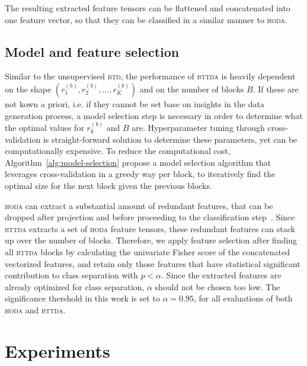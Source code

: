 \documentclass[twocolumn]{article}
\begin{document}
The resulting extracted feature tensors can be flattened and concatenated into
one feature vector, so that they can be classified in a similar manner to
\textsc{hoda}.


\subsection{Model and feature selection}
Similar to the unsupervised \textsc{btd}, the performance of \textsc{bttda} is
heavily dependent on the shape $\left(r_1^{(b)}, r_2^{(b)}, \ldots,
r_K^{(b)}\right)$ and on the number of blocks $B$.
If these are not kown a priori, i.e. if they cannot be set base on insights in the
data generation process, a model selection step is necessary in order to
determine what the optimal values for $r_k^{(b)}$ and $B$ are.
Hyperparameter tuning through cross-validation is straight-forward solution to
determine these parameters, yet can be computationally expensive.
To reduce the computational cost, Algorithm~\ref{alg:model-selection} propose a model selection algorithm that
leverages cross-validation in a greedy way per block, to iteratively find the
optimal size for the next block given the previous blocks.

\textsc{hoda} can extract a substantial amount of redundant features, that can
be dropped after projection and before proceeding to the classification
step~\cite{Phan2010}.
Since \textsc{bttda} extracts a set of \textsc{hoda}
feature tensors, these redundant features can stack up over the number of
blocks.
Therefore, we apply feature selection after finding all \textsc{bttda} blocks
by calculating the univariate Fisher score of the concatenated vectorized
features, and retain only those features that have  statistical significant
contribution to class separation with $p<\alpha$.
Since the extracted features are already optimized for class separation,
$\alpha$ should not be chosen too low.
The significance thershold in this work is set to $\alpha=0.95$, for all
evaluations of both \textsc{hoda} and \textsc{bttda}.


\section{Experiments}
\end{document}
